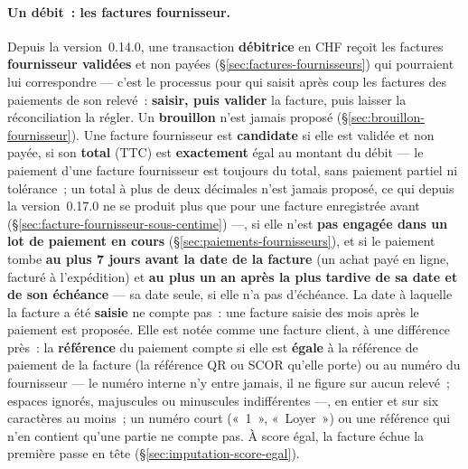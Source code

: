 \documentclass[a4paper,11pt,oneside]{article}
\begin{document}
\paragraph{Un débit~: les factures fournisseur.}\label{sec:matching-fournisseur} Depuis la version~0.14.0, une transaction \textbf{débitrice} en CHF reçoit les factures \textbf{fournisseur validées} et non payées (\S\ref{sec:factures-fournisseurs}) qui pourraient lui correspondre --- c'est le processus pour qui saisit après coup les factures des paiements de son relevé~: \textbf{saisir, puis valider} la facture, puis laisser la réconciliation la régler. Un \textbf{brouillon} n'est jamais proposé (\S\ref{sec:brouillon-fournisseur}). Une facture fournisseur est \textbf{candidate} si elle est validée et non payée, si son \textbf{total} (TTC) est \textbf{exactement} égal au montant du débit --- le paiement d'une facture fournisseur est toujours du total, sans paiement partiel ni tolérance~; un total à plus de deux décimales n'est jamais proposé, ce qui depuis la version~0.17.0 ne se produit plus que pour une facture enregistrée avant (\S\ref{sec:facture-fournisseur-sous-centime}) ---, si elle n'est \textbf{pas engagée dans un lot de paiement en cours} (\S\ref{sec:paiements-fournisseurs}), et si le paiement tombe \textbf{au plus 7 jours avant la date de la facture} (un achat payé en ligne, facturé à l'expédition) et \textbf{au plus un an après la plus tardive de sa date et de son échéance} --- sa date seule, si elle n'a pas d'échéance. La date à laquelle la facture a été \textbf{saisie} ne compte pas~: une facture saisie des mois après le paiement est proposée. Elle est notée comme une facture client, à une différence près~: la \textbf{référence} du paiement compte si elle est \textbf{égale} à la référence de paiement de la facture (la référence QR ou SCOR qu'elle porte) ou au numéro du fournisseur --- le numéro interne n'y entre jamais, il ne figure sur aucun relevé~; espaces ignorés, majuscules ou minuscules indifférentes ---, en entier et sur six caractères au moins~; un numéro court («~1~», «~Loyer~») ou une référence qui n'en contient qu'une partie ne compte pas. À score égal, la facture échue la première passe en tête (\S\ref{sec:imputation-score-egal}).
\end{document}
